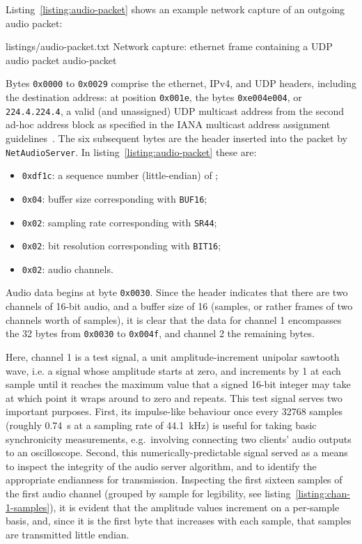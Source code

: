 Listing~\ref{listing:audio-packet} shows an example network capture of an
outgoing audio packet:

{listings/audio-packet.txt}
{Network capture: ethernet frame containing a UDP audio packet}
{audio-packet}

Bytes \texttt{0x0000} to \texttt{0x0029} comprise the ethernet, IPv4, and UDP
headers, including the destination address: at position \texttt{0x001e}, the
bytes \texttt{0xe004e004}, or \texttt{224.4.224.4}, a valid (and unassigned)
UDP multicast address from the second ad-hoc address block as specified in the
IANA multicast address assignment guidelines~\citep{meyer_iana_2010}.
The six subsequent bytes are the header inserted into the packet by
\texttt{NetAudioServer}.
In listing~\ref{listing:audio-packet} these are:
\begin{itemize}
    \item \texttt{0xdf1c}: a sequence number (little-endian) of ;
    \item \texttt{0x04}: buffer size  corresponding with
    \texttt{BUF16};
    \item \texttt{0x02}: sampling rate  corresponding with
    \texttt{SR44};
    \item \texttt{0x02}: bit resolution  corresponding with
    \texttt{BIT16};
    \item \texttt{0x02}:  audio channels.
\end{itemize}

Audio data begins at byte \texttt{0x0030}.
Since the header indicates that there are two channels of 16-bit audio, and a
buffer size of 16 (samples, or rather frames of two channels worth of samples),
it is clear that the data for channel 1 encompasses the 32 bytes from
\texttt{0x0030} to \texttt{0x004f}, and channel 2 the remaining bytes.

Here, channel 1 is a test signal, a unit amplitude-increment unipolar sawtooth
wave, i.e. a signal whose amplitude starts at zero, and increments by 1 at each
sample until it reaches the maximum value that a signed 16-bit integer may take
\textemdash{}  \textemdash{} at which point it wraps around to
zero and repeats.
This test signal serves two important purposes.
First, its impulse-like behaviour once every \num{32768} samples (roughly
\qty{.74}{\s} at a sampling rate of \qty{44.1}{\kHz}) is useful for taking basic
synchronicity measurements, e.g.\ involving connecting two clients' audio
outputs to an oscilloscope.
Second, this numerically-predictable signal served as a means to inspect the
integrity of the audio server algorithm, and to identify the appropriate
endianness for transmission.
Inspecting the first sixteen samples of the first audio channel (grouped
by sample for legibility, see listing~\ref{listing:chan-1-samples}), it is
evident that the amplitude values increment on a per-sample basis, and, since it
is the first byte that increases with each sample, that samples are transmitted
little endian.

